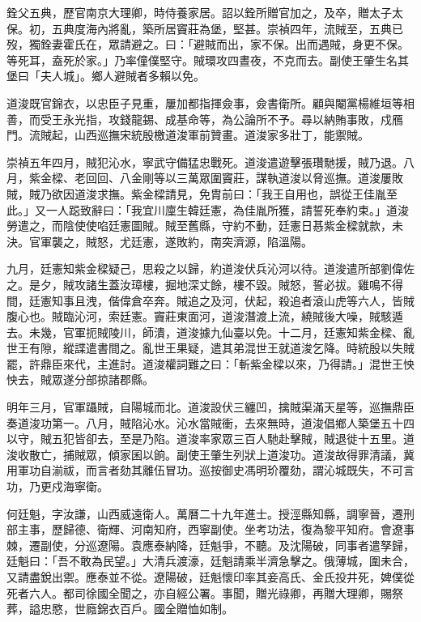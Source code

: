\begin{pinyinscope}
銓父五典，歷官南京大理卿，時侍養家居。詔以銓所贈官加之，及卒，贈太子太保。初，五典度海內將亂，築所居竇莊為堡，堅甚。崇禎四年，流賊至，五典已歿，獨銓妻霍氏在，眾請避之。曰：「避賊而出，家不保。出而遇賊，身更不保。等死耳，盍死於家。」乃率僮僕堅守。賊環攻四晝夜，不克而去。副使王肇生名其堡曰「夫人城」。鄉人避賊者多賴以免。

道浚既官錦衣，以忠臣子見重，屢加都指揮僉事，僉書衛所。顧與閹黨楊維垣等相善，而受王永光指，攻錢龍錫、成基命等，為公論所不予。尋以納賄事敗，戍鴈門。流賊起，山西巡撫宋統殷檄道浚軍前贊畫。道浚家多壯丁，能禦賊。

崇禎五年四月，賊犯沁水，寧武守備猛忠戰死。道浚遣遊擊張瓚馳援，賊乃退。八月，紫金樑、老回回、八金剛等以三萬眾圍竇莊，謀執道浚以脅巡撫。道浚屢敗賊，賊乃欲因道浚求撫。紫金樑請見，免胄前曰：「我王自用也，誤從王佳胤至此。」又一人跽致辭曰：「我宜川廩生韓廷憲，為佳胤所獲，請誓死奉約束。」道浚勞遣之，而陰使使啗廷憲圖賊。賊至舊縣，守約不動，廷憲日惎紫金樑就款，未決。官軍襲之，賊怒，尤廷憲，遂敗約，南突濟源，陷溫陽。

九月，廷憲知紫金樑疑己，思殺之以歸，約道浚伏兵沁河以待。道浚遣所部劉偉佐之。是夕，賊攻諸生蓋汝璋樓，掘地深丈餘，樓不毀。賊怒，誓必拔。雞鳴不得間，廷憲知事且洩，偕偉倉卒奔。賊追之及河，伏起，殺追者滾山虎等六人，皆賊腹心也。賊臨沁河，索廷憲。竇莊東面河，道浚潛渡上流，繞賊後大噪，賊駭遁去。未幾，官軍扼賊陵川，師潰，道浚據九仙臺以免。十二月，廷憲知紫金樑、亂世王有隙，縱諜遣書間之。亂世王果疑，遣其弟混世王就道浚乞降。時統殷以失賊罷，許鼎臣來代，主進討。道浚權詞難之曰：「斬紫金樑以來，乃得請。」混世王怏怏去，賊眾遂分部掠諸郡縣。

明年三月，官軍躡賊，自陽城而北。道浚設伏三纏凹，擒賊渠滿天星等，巡撫鼎臣奏道浚功第一。八月，賊陷沁水。沁水當賊衝，去來無時，道浚倡鄉人築堡五十四以守，賊五犯皆卻去，至是乃陷。道浚率家眾三百人馳赴擊賊，賊退徙十五里。道浚收散亡，捕賊眾，傾家囷以餉。副使王肇生列狀上道浚功。道浚故得罪清議，冀用軍功自湔祓，而言者劾其離伍冒功。巡按御史馮明玠覆劾，謂沁城既失，不可言功，乃更戍海寧衛。

何廷魁，字汝謙，山西威遠衛人。萬曆二十九年進士。授涇縣知縣，調寧晉，遷刑部主事，歷歸德、衛輝、河南知府，西寧副使。坐考功法，復為黎平知府。會遼事棘，遷副使，分巡遼陽。袁應泰納降，廷魁爭，不聽。及沈陽破，同事者遣孥歸，廷魁曰：「吾不敢為民望。」大清兵渡濠，廷魁請乘半濟急擊之。俄薄城，圍未合，又請盡銳出禦。應泰並不從。遼陽破，廷魁懷印率其妾高氏、金氏投井死，婢僕從死者六人。都司徐國全聞之，亦自經公署。事聞，贈光祿卿，再贈大理卿，賜祭葬，謚忠愍，世廕錦衣百戶。國全贈恤如制。


\end{pinyinscope}
